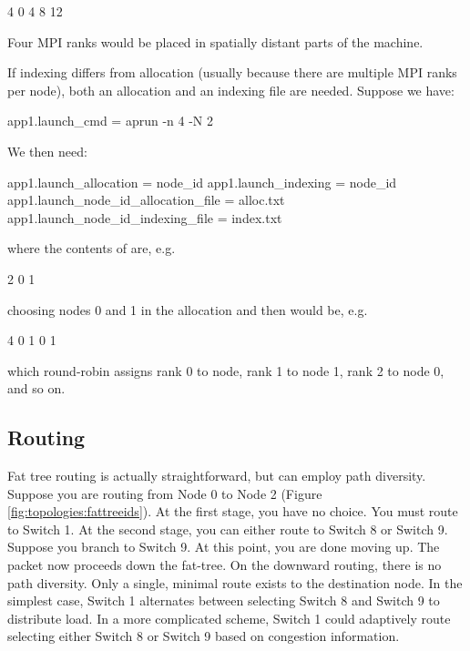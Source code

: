 \begin{ViFile}
4
0
4
8
12
\end{ViFile}
Four MPI ranks would be placed in spatially distant parts of the machine.

If indexing differs from allocation (usually because there are multiple MPI ranks per node), both an allocation and an indexing file are needed.
Suppose we have:

\begin{ViFile}
app1.launch_cmd = aprun -n 4 -N 2
\end{ViFile}
We then need:

\begin{ViFile}
app1.launch_allocation = node_id
app1.launch_indexing = node_id
app1.launch_node_id_allocation_file = alloc.txt
app1.launch_node_id_indexing_file = index.txt
\end{ViFile}
where the contents of  are, e.g.

\begin{ViFile}
2
0
1
\end{ViFile}
choosing nodes 0 and 1 in the allocation and then  would be, e.g.

\begin{ViFile}
4
0
1
0
1
\end{ViFile}
which round-robin assigns rank 0 to node, rank 1 to node 1, rank 2 to node 0, and so on.

\subsection{Routing}
Fat tree routing is actually straightforward, but can employ path diversity.
Suppose you are routing from Node 0 to Node 2 (Figure \ref{fig:topologies:fattreeids}).
At the first stage, you have no choice.
You must route to Switch 1.
At the second stage, you can either route to Switch 8 or Switch 9.
Suppose you branch to Switch 9. 
At this point, you are done moving up.
The packet now proceeds down the fat-tree.
On the downward routing, there is no path diversity.
Only a single, minimal route exists to the destination node.
In the simplest case, Switch 1 alternates between selecting Switch 8 and Switch 9 to distribute load.
In a more complicated scheme, Switch 1 could adaptively route selecting either Switch 8 or Switch 9 based on congestion information.
